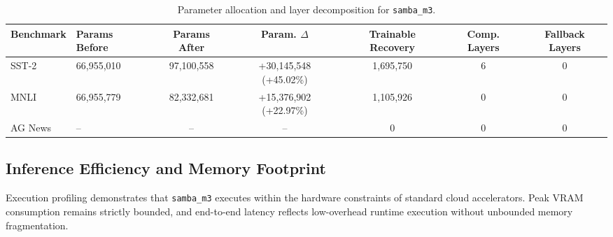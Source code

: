 \begin{table}[t]
\centering
\small
\begin{tabular}{llccccc}
\toprule
\textbf{Benchmark} & \textbf{Params Before} & \textbf{Params After} & \textbf{Param. $\Delta$} & \textbf{Trainable Recovery} & \textbf{Comp. Layers} & \textbf{Fallback Layers} \\
\midrule
SST-2 & 66,955,010 & 97,100,558 & +30,145,548 (+45.02\%) & 1,695,750 & 6 & 0 \\
MNLI & 66,955,779 & 82,332,681 & +15,376,902 (+22.97\%) & 1,105,926 & 0 & 0 \\
AG News & -- & -- & -- & 0 & 0 & 0 \\
\bottomrule
\end{tabular}
\caption{Parameter allocation and layer decomposition for \texttt{samba\_m3}.}
\label{tab:params_samba_m3}
\end{table}

\subsection{Inference Efficiency and Memory Footprint}
Execution profiling demonstrates that \texttt{samba\_m3} executes within the hardware constraints of standard cloud accelerators. Peak VRAM consumption remains strictly bounded, and end-to-end latency reflects low-overhead runtime execution without unbounded memory fragmentation.
